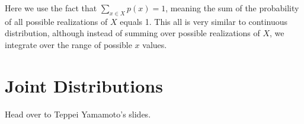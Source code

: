 \documentclass{article} %
\begin{document}
Here we use the fact that $\sum_{x \in X} p(x) = 1$, meaning the sum of the probability of all possible realizations of $X$ equals 1. This all is very similar to continuous distribution, although instead of summing over possible realizations of $X$, we integrate over the range of possible $x$ values.

\section{Joint Distributions}

Head over to Teppei Yamamoto's slides.
\end{document}
